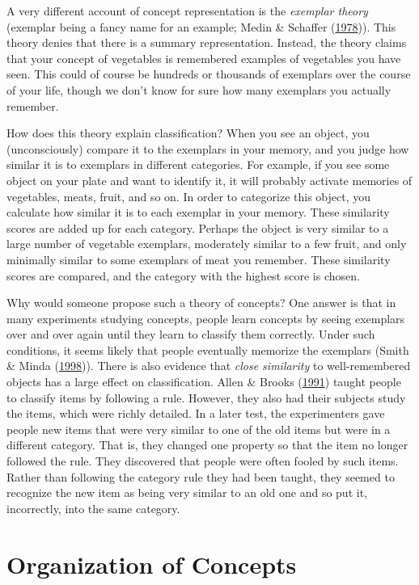 \documentclass[
]{krantz}
\begin{document}
A very different account of concept representation is the \emph{exemplar theory} (exemplar being a fancy name for an example; Medin \& Schaffer (\protect\hyperlink{ref-Medin1978}{1978})). This theory denies that there is a summary representation. Instead, the theory claims that your concept of vegetables is remembered examples of vegetables you have seen. This could of course be hundreds or thousands of exemplars over the course of your life, though we don't know for sure how many exemplars you actually remember.

How does this theory explain classification? When you see an object, you (unconsciously) compare it to the exemplars in your memory, and you judge how similar it is to exemplars in different categories. For example, if you see some object on your plate and want to identify it, it will probably activate memories of vegetables, meats, fruit, and so on. In order to categorize this object, you calculate how similar it is to each exemplar in your memory. These similarity scores are added up for each category. Perhaps the object is very similar to a large number of vegetable exemplars, moderately similar to a few fruit, and only minimally similar to some exemplars of meat you remember. These similarity scores are compared, and the category with the highest score is chosen.

Why would someone propose such a theory of concepts? One answer is that in many experiments studying concepts, people learn concepts by seeing exemplars over and over again until they learn to classify them correctly. Under such conditions, it seems likely that people eventually memorize the exemplars (Smith \& Minda (\protect\hyperlink{ref-Smith1998}{1998})). There is also evidence that \emph{close similarity} to well-remembered objects has a large effect on classification. Allen \& Brooks (\protect\hyperlink{ref-Allen1991}{1991}) taught people to classify items by following a rule. However, they also had their subjects study the items, which were richly detailed. In a later test, the experimenters gave people new items that were very similar to one of the old items but were in a different category. That is, they changed one property so that the item no longer followed the rule. They discovered that people were often fooled by such items. Rather than following the category rule they had been taught, they seemed to recognize the new item as being very similar to an old one and so put it, incorrectly, into the same category.

\hypertarget{organization-of-concepts}{%
\section{Organization of Concepts}\label{organization-of-concepts}}
\end{document}
